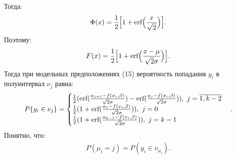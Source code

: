 \documentclass[12pt]{article}
\begin{document}
Тогда:
\begin{eqnarray}
    \Phi(x)= \frac{1}{2} \Big[1+\textup{erf}\Big(\frac{x}{\sqrt{2}} \Big) \Big].
\end{eqnarray}
Поэтому:
\begin{eqnarray}
    F(x)= \frac{1}{2} \Big[1+\textup{erf}\Big(\frac{x-\mu}{\sqrt{2}\sigma} \Big) \Big].
\end{eqnarray}
Тогда при модельных предположениях (15) вероятность попадания $y_i$ в полуинтервал $\nu_j$ равна:
\begin{eqnarray}
    P\{y_i\in\nu_j\}=
    \begin{cases}
        \frac{1}{2}(\textup{erf}(\frac{a_{j+1}-f(x_i,\beta)}{\sqrt{2}\sigma})-\textup{erf}(\frac{a_{j}-f(x_i,\beta)}{\sqrt{2}\sigma})),~j=\overline{1,k-2}\\
        \frac{1}{2}(1+\textup{erf}(\frac{a_{1}-f(x_i,\beta)}{\sqrt{2}\sigma})),~j=0\\
        \frac{1}{2}(1+\textup{erf}(\frac{a_{k-1}-f(x_i,\beta)}{\sqrt{2}\sigma})),~j=k-1
    \end{cases}.
\end{eqnarray}
Понятно, что:
\begin{eqnarray}
    P(\mu_i=j)=P(y_i\in \nu_{\mu_i}).
\end{eqnarray}
\end{document}
